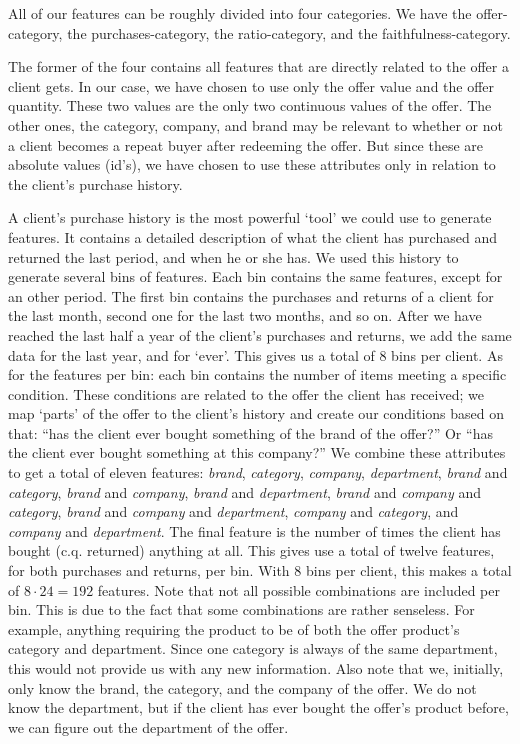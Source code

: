 \documentclass[a4paper]{jmlr}
\begin{document}
All of our features can be roughly divided into four categories. We have the offer-category, the purchases-category, the ratio-category, and the faithfulness-category.

The former of the four contains all features that are directly related to the offer a client gets. In our case, we have chosen to use only the offer value and the offer quantity. These two values are the only two continuous values of the offer. The other ones, the category, company, and brand may be relevant to whether or not a client becomes a repeat buyer after redeeming the offer. But since these are absolute values (id's), we have chosen to use these attributes only in relation to the client's purchase history.

A client's purchase history is the most powerful `tool' we could use to generate features. It contains a detailed description of what the client has purchased and returned the last period, and when he or she has. We used this history to generate several bins of features. Each bin contains the same features, except for an other period. The first bin contains the purchases and returns of a client for the last month, second one for the last two months, and so on. After we have reached the last half a year of the client's purchases and returns, we add the same data for the last year, and for `ever'. This gives us a total of 8 bins per client. As for the features per bin: each bin contains the number of items meeting a specific condition. These conditions are related to the offer the client has received; we map `parts' of the offer to the client's history and create our conditions based on that: ``has the client ever bought something of the brand of the offer?'' Or ``has the client ever bought something at this company?'' We combine these attributes to get a total of eleven features: \emph{brand}, \emph{category}, \emph{company}, \emph{department}, \emph{brand} and \emph{category}, \emph{brand} and \emph{company}, \emph{brand} and \emph{department}, \emph{brand} and \emph{company} and \emph{category}, \emph{brand} and \emph{company} and \emph{department}, \emph{company} and \emph{category}, and \emph{company} and \emph{department}. The final feature is the number of times the client has bought (c.q. returned) anything at all. This gives use a total of twelve features, for both purchases and returns, per bin. With 8 bins per client, this makes a total of $8\cdot24=192$ features. Note that not all possible combinations are included per bin. This is due to the fact that some combinations are rather senseless. For example, anything requiring the product to be of both the offer product's category and department. Since one category is always of the same department, this would not provide us with any new information. Also note that we, initially, only know the brand, the category, and the company of the offer. We do not know the department, but if the client has ever bought the offer's product before, we can figure out the department of the offer.
\end{document}
